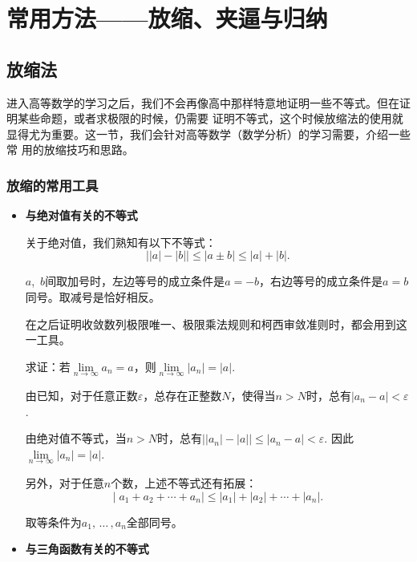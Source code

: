 \section{常用方法——放缩、夹逼与归纳}
\subsection{放缩法}
进入高等数学的学习之后，我们不会再像高中那样特意地证明一些不等式。但在证明某些命题，或者求极限的时候，仍需要
证明不等式，这个时候放缩法的使用就显得尤为重要。这一节，我们会针对高等数学（数学分析）的学习需要，介绍一些常
用的放缩技巧和思路。
\subsubsection{放缩的常用工具}


\begin{itemize}
    \item \textbf{与绝对值有关的不等式}

          关于绝对值，我们熟知有以下不等式：
          \begin{equation}
              \big | \lvert a \rvert-\lvert b\rvert  \big |
              \leqslant \lvert a\pm b\rvert \leqslant \lvert a\rvert +\lvert b\rvert
              .
              \label{三角不等式}
            \end{equation}

          $a$,~$b$间取加号时，左边等号的成立条件是$a=-b$，右边等号的成立条件是$a=b$同号。取减号是恰好相反。

          在之后证明收敛数列极限唯一、极限乘法规则和柯西审敛准则时，都会用到这一工具。
          \begin{example}
              求证：若$\lim\limits_{n \to \infty} a_n =a$，则$\lim\limits_{n \to \infty} |a_n| =|a|$.
          \end{example}
          \begin{prove}
              由已知，对于任意正数$\varepsilon$，总存在正整数$N$，使得当$n>N$时，总有$|a_n-a|<\varepsilon$.


              由绝对值不等式，当$n>N$时，总有$\big ||a_n|-|a|\big |\leqslant |a_n-a|<\varepsilon$.
              因此$\lim\limits_{n \to \infty} |a_n| =|a|$.
          \end{prove}
          另外，对于任意$n$个数，上述不等式还有拓展：
          \[
              |\;\!a_1+a_2+\cdots +a_n|\leqslant |a_1|+|a_2|+\cdots +|a_n|
              .\]

          取等条件为$a_1,\,\dots\,,a_n$全部同号。
    \item \textbf{与三角函数有关的不等式}


\end{itemize}
